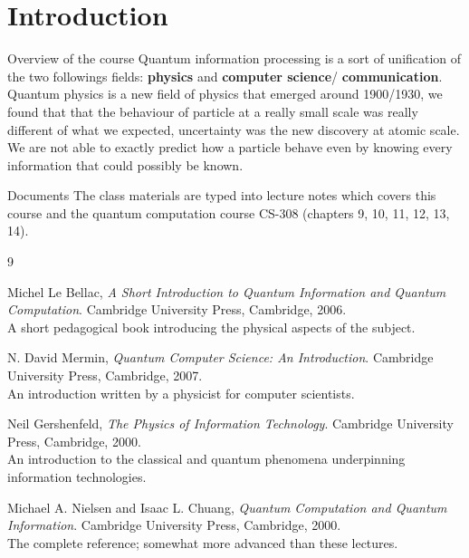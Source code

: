 \documentclass[a4paper, openany]{book}
\begin{document}
\newpage


\tableofcontents
\newpage

\section*{Introduction}

\begin{parag}{Overview of the course}
	Quantum information processing is a sort of unification of the two followings fields: \textbf{physics} and \textbf{computer science}/ \textbf{communication}. Quantum physics is a new field of physics that emerged around 1900/1930, we found that that the behaviour of particle at a really small scale was really different of what we expected, uncertainty was the new discovery at atomic scale. We are not able to exactly predict how a particle behave even by knowing every information that could possibly be known.
\end{parag}
\begin{parag}{Documents}
    The class materials are typed into lecture notes which covers this course and the quantum computation course CS-308 (chapters 9, 10, 11, 12, 13, 14).  
\end{parag}











\newpage

\renewcommand{\refname}{References}

\begin{thebibliography}{9}

  Michel Le Bellac,
  \emph{A Short Introduction to Quantum Information and Quantum Computation}.
  Cambridge University Press, Cambridge, 2006. \\
  \small A short pedagogical book introducing the physical aspects of the subject.

  N. David Mermin,
  \emph{Quantum Computer Science: An Introduction}.
  Cambridge University Press, Cambridge, 2007. \\
  \small An introduction written by a physicist for computer scientists.

  Neil Gershenfeld,
  \emph{The Physics of Information Technology}.
  Cambridge University Press, Cambridge, 2000. \\
  \small An introduction to the classical and quantum phenomena underpinning information technologies.

  Michael A. Nielsen and Isaac L. Chuang,
  \emph{Quantum Computation and Quantum Information}.
  Cambridge University Press, Cambridge, 2000. \\
  \small The complete reference; somewhat more advanced than these lectures.

\end{thebibliography}
\end{document}
